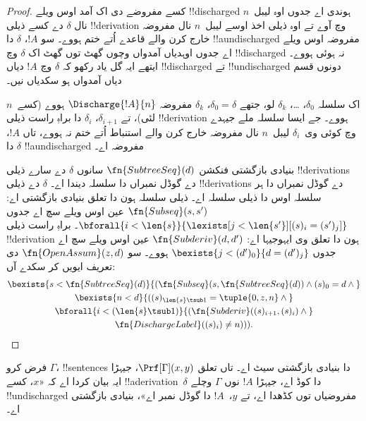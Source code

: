 \documentclass[../../../include/open-logic-section]{subfiles}
\begin{document}
\begin{proof}
  کسے مفروضے دی اک
  آمد اوس ویلے
  !!{discharged} ہوندی
  اے جدوں اوہ
  لیبل~$n$ نال
  $\delta$ دے کسے
  ذیلی !!{derivation}
  وچ آوے تے اوہ
  ذیلی اخذ اوسے لیبل~$n$ نال
  مفروضہ خارج کرن
  والے قاعدے اُتے
  ختم ہووے۔ سو
  $!A$، $\delta$
  دا !!a{undischarged}
  مفروضہ اوس ویلے
  اے جدوں اوہدیاں
  آمدواں وچوں گھٹ
  توں گھٹ اک
  $\delta$ وچ
  !!{discharged} نہ ہوئی
  ہووے۔ ایتھے ایہ گل یاد رکھو کہ
  $\delta$ وچ
  $!A$ دیاں
  !!{discharged} تے
  !!{undischarged}
  دونوں قسم دیاں
  آمدواں ہو سکدیاں
  نیں۔

  اک سلسلہ
  $\delta_0$، \dots،
  $\delta_k$ لو،
  جتھے $\delta_0 =
  \delta$، $\delta_k$
  مفروضہ
  $\Discharge{!A}{n}$
  ہووے (کسے~$n$ لئی)، تے
  $\delta_{i+1}$،
  $\delta_i$ دا
  براہِ راست ذیلی
  !!{derivation}
  ہووے۔ جے ایسا سلسلہ ملے جیہدے وچ کوئی
  وی~$\delta_i$
  لیبل~$n$ نال
  مفروضہ خارج
  کرن والے
  استنباط اُتے
  ختم نہ ہووے،
  تاں $!A$،
  $\delta$ دا
  !!a{undischarged}
  مفروضہ اے۔

  بنیادی بازگشتی فنکشن
  $\fn{SubtreeSeq}(d)$
  سانوں $\delta$ دے
  سارے ذیلی
  !!{derivation}s دے
  گوڈل نمبراں دا
  سلسلہ دیندا اے۔
  $\delta$ دے ذیلی
  !!{derivation}s دے
  گوڈل نمبراں دا
  ہر سلسلہ اوس دا
  ذیلی سلسلہ اے۔
  ذیلی سلسلہ ہون
  دا تعلق بنیادی
  بازگشتی اے:
  $\fn{Subseq}(s, s')$
  عین اوس ویلے
  سچ اے جدوں
  $\bforall{i<\len{s}}{\lexists[j<\len{s'}][(s)_i = (s')_j]}$۔
  براہِ راست ذیلی
  !!{derivation}
  ہون دا تعلق وی
  ایہوجیہا اے:
  $\fn{Subderiv}(d, d')$
  عین اوس ویلے
  سچ اے جدوں
  $\bexists{j<(d')_0}{d = (d')_j}$
  ہووے۔ سو $\fn{OpenAssum}(z, d)$ دی تعریف ایویں کر سکدے آں:
  \begin{multline*}
    \bexists{s<\fn{SubtreeSeq}(d)}{(\fn{Subseq}(s, \fn{SubtreeSeq}(d))
      \land (s)_0 = d \land {}} \\
    \bexists{n<d}{((s)_{\len{s} \tsub 1} = \tuple{0, z, n} \land {}}\\
      \bforall{i<(\len{s} \tsub 1)}{(\fn{Subderiv}((s)_{i+1}, (s)_i) \land {}}\\
      \fn{DischargeLabel}((s)_i) \neq n))).
  \end{multline*}
\end{proof}

\begin{prop}
  فرض کرو $\Gamma$،
  !!{sentence}s دا
  بنیادی بازگشتی
  سیٹ اے۔ تاں
  تعلق
  $\Prf[\Gamma](x, y)$،
  جیہڑا ایہ بیان
  کردا اے کہ
  «$x$، کسے
  !!a{derivation}~$\delta$
  دا کوڈ اے،
  جیہڑا $!A$ نوں $\Gamma$ وچلے !!{undischarged} مفروضیاں توں کڈھدا اے، تے
  $y$،~$!A$
  دا گوڈل نمبر
  اے»، بنیادی
  بازگشتی اے۔
\end{prop}
\end{document}
